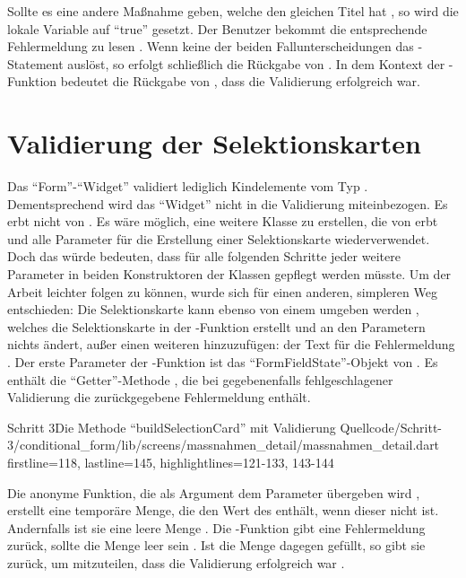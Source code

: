 Sollte es eine andere Maßnahme geben, welche den gleichen Titel hat ,
so wird die lokale Variable  auf \enquote{true} gesetzt.
Der Benutzer bekommt die entsprechende Fehlermeldung  zu lesen .
Wenn keine der beiden Fallunterscheidungen das -Statement  auslöst, so erfolgt schließlich die Rückgabe von  .
In dem Kontext der -Funktion bedeutet die Rückgabe von , dass die Validierung erfolgreich war.
 
\clearpage
\section{Validierung der Selektionskarten}
 
Das \enquote{Form}-\enquote{Widget} validiert lediglich Kindelemente vom Typ .
Dementsprechend wird das \enquote{Widget}  nicht in die Validierung miteinbezogen.
Es erbt nicht von .
Es wäre möglich, eine weitere Klasse zu erstellen, die von  erbt und alle Parameter für die Erstellung einer Selektionskarte wiederverwendet.
Doch das würde bedeuten, dass für alle folgenden Schritte jeder weitere Parameter in beiden Konstruktoren der Klassen gepflegt werden müsste.
Um der Arbeit leichter folgen zu können, wurde sich für einen anderen, simpleren Weg entschieden: 
Die Selektionskarte kann ebenso von einem  umgeben werden ,
welches die Selektionskarte in der -Funktion erstellt und an den Parametern nichts ändert,
außer einen weiteren hinzuzufügen: der Text für die Fehlermeldung .
Der erste Parameter der -Funktion ist das \enquote{FormFieldState}-Objekt von .
Es enthält die \enquote{Getter}-Methode , die bei gegebenenfalls fehlgeschlagener Validierung die zurückgegebene Fehlermeldung enthält.

\begin{alexlisting}{Schritt 3}{Die Methode \enquote{buildSelectionCard} mit Validierung}
    {Quellcode/Schritt-3/conditional_form/lib/screens/massnahmen_detail/massnahmen_detail.dart}
    {firstline=118, lastline=145, highlightlines={121-133, 143-144}}
    \label{lst:Schritt3buildSelectionCardValidator}
\end{alexlisting}

Die anonyme Funktion, die als Argument dem Parameter  übergeben wird , erstellt eine temporäre Menge,
die den Wert des  enthält, wenn dieser nicht  ist.
Andernfalls ist sie eine leere Menge .
Die -Funktion gibt eine Fehlermeldung zurück, sollte die Menge leer sein .
Ist die Menge dagegen gefüllt, so gibt sie  zurück, um mitzuteilen, dass die Validierung erfolgreich war .




